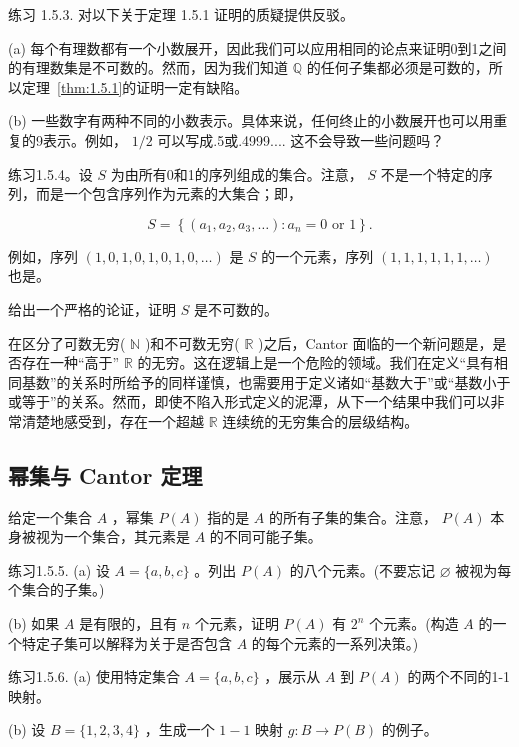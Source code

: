 练习 1.5.3. 对以下关于定理 1.5.1 证明的质疑提供反驳。

(a) 每个有理数都有一个小数展开，因此我们可以应用相同的论点来证明0到1之间的有理数集是不可数的。然而，因为我们知道 \(\mathbb{Q}\) 的任何子集都必须是可数的，所以定理~\ref{thm:1.5.1}的证明一定有缺陷。

(b) 一些数字有两种不同的小数表示。具体来说，任何终止的小数展开也可以用重复的9表示。例如， \(1/2\) 可以写成.5或.4999.... 这不会导致一些问题吗？

练习1.5.4。设 \(S\) 为由所有0和1的序列组成的集合。注意， \(S\) 不是一个特定的序列，而是一个包含序列作为元素的大集合；即，

\[
S = \left\{  {\left( {{a}_{1},{a}_{2},{a}_{3},\ldots }\right)  : {a}_{n} = 0\text{ or }1}\right\}  .
\]

例如，序列 \(\left( {1,0,1,0,1,0,1,0,\ldots }\right)\) 是 \(S\) 的一个元素，序列 \(\left( {1,1,1,1,1,1,\ldots }\right)\) 也是。

给出一个严格的论证，证明 \(S\) 是不可数的。

在区分了可数无穷( \(\mathbb{N}\) )和不可数无穷( \(\mathbb{R}\) )之后，Cantor 面临的一个新问题是，是否存在一种“高于” \(\mathbb{R}\) 的无穷。这在逻辑上是一个危险的领域。我们在定义“具有相同基数”的关系时所给予的同样谨慎，也需要用于定义诸如“基数大于”或“基数小于或等于”的关系。然而，即使不陷入形式定义的泥潭，从下一个结果中我们可以非常清楚地感受到，存在一个超越 \(\mathbb{R}\) 连续统的无穷集合的层级结构。

\subsection{幂集与 Cantor 定理}

给定一个集合 \(A\) ，幂集 \(P\left( A\right)\) 指的是 \(A\) 的所有子集的集合。注意， \(P\left( A\right)\) 本身被视为一个集合，其元素是 \(A\) 的不同可能子集。

练习1.5.5. (a) 设 \(A = \{ a,b,c\}\) 。列出 \(P\left( A\right)\) 的八个元素。(不要忘记 \(\varnothing\) 被视为每个集合的子集。)

(b) 如果 \(A\) 是有限的，且有 \(n\) 个元素，证明 \(P\left( A\right)\) 有 \({2}^{n}\) 个元素。(构造 \(A\) 的一个特定子集可以解释为关于是否包含 \(A\) 的每个元素的一系列决策。)

练习1.5.6. (a) 使用特定集合 \(A = \{ a,b,c\}\) ，展示从 \(A\) 到 \(P\left( A\right)\) 的两个不同的1-1映射。

(b) 设 \(B = \{ 1,2,3,4\}\) ，生成一个 \(1 - 1\) 映射 \(g : B \rightarrow  P\left( B\right)\) 的例子。

